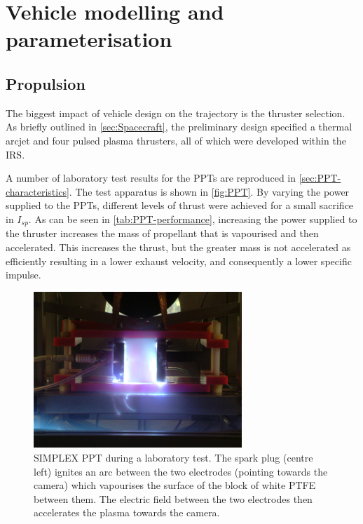 \chapter{Vehicle modelling and parameterisation}\label{cha:Vehicle}

\section{Propulsion} \label{sec:Propulsion}

The biggest impact of vehicle design on the trajectory is the thruster selection. As briefly outlined in \autoref{sec:Spacecraft}, the preliminary design specified a thermal arcjet and four pulsed plasma thrusters, all of which were developed within the IRS. 

A number of laboratory test results for the PPTs are reproduced in \autoref{sec:PPT-characteristics}. The test apparatus is shown in \autoref{fig:PPT}. By varying the power supplied to the PPTs, different levels of thrust were achieved for a small sacrifice in $I_{sp}$. As can be seen in \autoref{tab:PPT-performance}, increasing the power supplied to the thruster increases the mass of propellant that is vapourised and then accelerated. This increases the thrust, but the greater mass is not accelerated as efficiently resulting in a lower exhaust velocity, and consequently a lower specific impulse. 

\begin{figure}
\caption{SIMPLEX PPT during a laboratory test. The spark plug (centre left) ignites an arc between the two electrodes (pointing towards the camera) which vapourises the surface of the block of white PTFE between them. The electric field between the two electrodes then accelerates the plasma towards the camera.} \label{fig:PPT}
\centering
\includegraphics[width=0.7\textwidth]{Images/PPT_test.JPG}
\end{figure}

